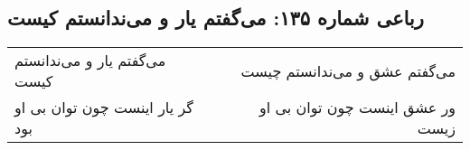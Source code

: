 \begin{center}
\section*{رباعی شماره ۱۳۵: می‌گفتم یار و می‌ندانستم کیست}
\label{sec:sh135}
\begin{longtable}{l p{0.5cm} r}
می‌گفتم یار و می‌ندانستم کیست
&&
می‌گفتم عشق و می‌ندانستم چیست
\\
گر یار اینست چون توان بی او بود
&&
ور عشق اینست چون توان بی او زیست
\\
\end{longtable}
\end{center}
